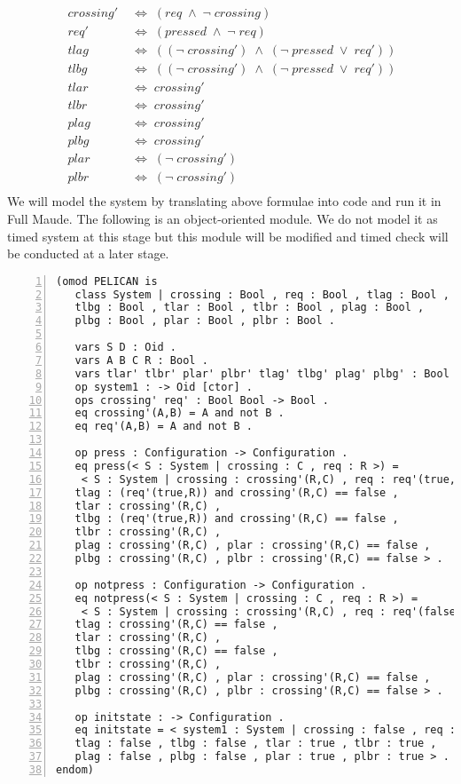 \documentclass{report}
\begin{document}
\begin{align*}
\;crossing'\;&\Leftrightarrow\;(req\;\wedge\;\neg\;crossing)\\
\;req'\;&\Leftrightarrow\;(pressed\;\wedge\;\neg\;req)\\
\;tlag\;&\Leftrightarrow\;((\neg\;crossing')\;\wedge\;(\neg\;pressed\;\vee\;req'))\\
\;tlbg\;&\Leftrightarrow\;((\neg\;crossing')\;\wedge\;(\neg\;pressed\;\vee\;req'))\\
\;tlar\;&\Leftrightarrow\;crossing'\\
\;tlbr\;&\Leftrightarrow\;crossing'\\
\;plag\;&\Leftrightarrow\;crossing'\\
\;plbg\;&\Leftrightarrow\;crossing'\\
\;plar\;&\Leftrightarrow\;(\neg\;crossing')\\
\;plbr\;&\Leftrightarrow\;(\neg\;crossing')\\
\end{align*}
We will model the system by translating above formulae into code and run it in Full Maude. The following is an object-oriented module. We do not model it as timed system at this stage but this module will be modified and timed check will be conducted at a later stage.
\newpage
\begin{lstlisting}[numbers=left, frame=lines, xleftmargin=5.0ex]
(omod PELICAN is 
   class System | crossing : Bool , req : Bool , tlag : Bool ,
   tlbg : Bool , tlar : Bool , tlbr : Bool , plag : Bool , 
   plbg : Bool , plar : Bool , plbr : Bool .

   vars S D : Oid .
   vars A B C R : Bool .
   vars tlar' tlbr' plar' plbr' tlag' tlbg' plag' plbg' : Bool .
   op system1 : -> Oid [ctor] .
   ops crossing' req' : Bool Bool -> Bool .
   eq crossing'(A,B) = A and not B .
   eq req'(A,B) = A and not B .

   op press : Configuration -> Configuration .
   eq press(< S : System | crossing : C , req : R >) = 
    < S : System | crossing : crossing'(R,C) , req : req'(true,R) , 
   tlag : (req'(true,R)) and crossing'(R,C) == false ,
   tlar : crossing'(R,C) ,
   tlbg : (req'(true,R)) and crossing'(R,C) == false , 
   tlbr : crossing'(R,C) ,
   plag : crossing'(R,C) , plar : crossing'(R,C) == false ,
   plbg : crossing'(R,C) , plbr : crossing'(R,C) == false > .

   op notpress : Configuration -> Configuration .
   eq notpress(< S : System | crossing : C , req : R >) = 
    < S : System | crossing : crossing'(R,C) , req : req'(false,R) , 
   tlag : crossing'(R,C) == false ,
   tlar : crossing'(R,C) ,
   tlbg : crossing'(R,C) == false , 
   tlbr : crossing'(R,C) ,
   plag : crossing'(R,C) , plar : crossing'(R,C) == false ,
   plbg : crossing'(R,C) , plbr : crossing'(R,C) == false > .

   op initstate : -> Configuration .
   eq initstate = < system1 : System | crossing : false , req : false , 
   tlag : false , tlbg : false , tlar : true , tlbr : true ,
   plag : false , plbg : false , plar : true , plbr : true > .
endom)
\end{lstlisting}
\end{document}
